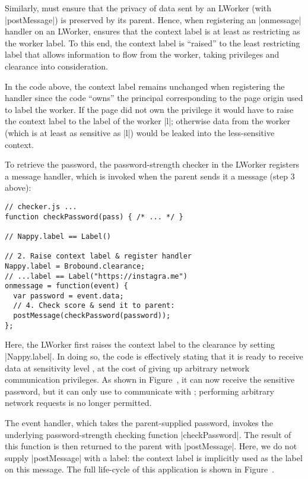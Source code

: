 Similarly, \sys{} must ensure that the privacy of data sent by an
LWorker (with \js|postMessage|) is preserved by its parent.
%
Hence, when registering an \js|onmessage| handler on an LWorker,
\sys{} ensures that the context label is at least as restricting as
the worker label.
%
To this end, the context label is ``raised'' to the least restricting
label that allows information to flow from the worker, taking
privileges and clearance into consideration.

In the  code above, the context label remains
unchanged when registering the handler since the code ``owns'' the
principal corresponding to the page origin used to label the worker.
%
If the page did not own the  privilege it would
have to raise the context label to the label of the worker \js|l|;
%
otherwise data from the worker (which is at least as sensitive as
\js|l|) would be leaked into the less-sensitive context.

To retrieve the password, the password-strength checker in the LWorker
registers a message handler, which is invoked when the parent
sends it a message (step 3 above):
\begin{lstlisting}
// checker.js ...
function checkPassword(pass) { /* ... */ }

// Nappy.label == Label()

// 2. Raise context label & register handler
Nappy.label = Brobound.clearance;
// ...label == Label("https://instagra.me")
onmessage = function(event) {
  var password = event.data;
  // 4. Check score & send it to parent:
  postMessage(checkPassword(password));
};
\end{lstlisting}
%
Here, the LWorker first raises the context label to the clearance by
setting \js|Nappy.label|.
%
In doing so, the code is effectively stating that it is ready to
receive data at sensitivity level , at the cost of
giving up arbitrary network communication privileges.
%
As shown in Figure~, it can now receive the
sensitive password, but it can only use \xhr{} to communicate with
;
%
performing arbitrary network requests is no longer permitted.

%
The event handler, which takes the parent-supplied password, invokes
the underlying password-strength checking function \js|checkPassword|.
%
The result of this function is then returned to the parent with
\js|postMessage|.
%
Here, we do not supply \js|postMessage| with a label: the context
label is implicitly used as the label on this message.
%
The full life-cycle of this application is shown in
Figure~.

